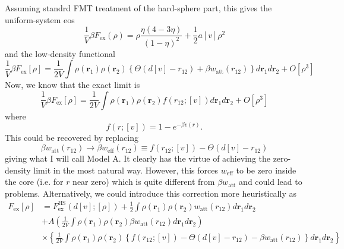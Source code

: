 \documentclass[aps,preprint]{revtex4-1}%
\begin{document}
Assuming standrd FMT treatment of the hard-sphere part, this gives the
uniform-system eos%
\begin{equation}
\frac{1}{V}\beta F_{\text{ex}}\left(  \rho\right)  =\rho\frac{\eta\left(
4-3\eta\right)  }{\left(  1-\eta\right)  ^{2}}+\frac{1}{2}a\left[  v\right]
\rho^{2}%
\end{equation}
and the low-density functional%
\begin{equation}
\frac{1}{V}\beta F_{\text{ex}}\left[  \rho\right]  =\frac{1}{2V}\int%
\rho\left(  \mathbf{r}_{1}\right)  \rho\left(  \mathbf{r}_{2}\right)  \left\{
\Theta\left(  d\left[  v\right]  -r_{12}\right)  +\beta w_{\text{att}}\left(
r_{12}\right)  \right\}  d\mathbf{r}_{1}d\mathbf{r}_{2}+O\left[  \rho
^{3}\right]
\end{equation}
Now, we know that the exact limit is
\begin{equation}
\frac{1}{V}\beta F_{\text{ex}}\left[  \rho\right]  =\frac{1}{2V}\int%
\rho\left(  \mathbf{r}_{1}\right)  \rho\left(  \mathbf{r}_{2}\right)  f\left(
r_{12};\left[  v\right]  \right)  d\mathbf{r}_{1}d\mathbf{r}_{2}+O\left[
\rho^{3}\right]
\end{equation}
where%
\begin{equation}
f\left(  r;\left[  v\right]  \right)  =1-e^{-\beta v\left(  r\right)  }.
\end{equation}
This could be recovered by replacing
\begin{equation}
\beta w_{\text{att}}\left(  r_{12}\right)  \rightarrow\beta w_{\text{eff}%
}\left(  r_{12}\right)  \equiv f\left(  r_{12};\left[  v\right]  \right)
-\Theta\left(  d\left[  v\right]  -r_{12}\right)
\end{equation}
giving what I will call Model A. It clearly has the virtue of achieving the
zero-density limit in the most natural way. However, this forces
$w_{\text{eff}}$ to be zero inside the core (i.e. for $r$ near zero) which is
quite different from $\beta w_{\text{att}}$ and could lead to problems.
Alternatively, we could introduce this correction more heuristically as%
\begin{align}
F_{\text{ex}}\left[  \rho\right]   &  =F_{\text{ex}}^{\text{HS}}\left(
d\left[  v\right]  ;\left[  \rho\right]  \right)  +\frac{1}{2}\int\rho\left(
\mathbf{r}_{1}\right)  \rho\left(  \mathbf{r}_{2}\right)  w_{\text{att}%
}\left(  r_{12}\right)  d\mathbf{r}_{1}d\mathbf{r}_{2}\\
&  +A\left(  \frac{1}{2V}\int\rho\left(  \mathbf{r}_{1}\right)  \rho\left(
\mathbf{r}_{2}\right)  \beta w_{\text{att}}\left(  r_{12}\right)
d\mathbf{r}_{1}d\mathbf{r}_{2}\right) \nonumber\\
&  \times\left\{  \frac{1}{2V}\int\rho\left(  \mathbf{r}_{1}\right)
\rho\left(  \mathbf{r}_{2}\right)  \left\{  f\left(  r_{12};\left[  v\right]
\right)  -\Theta\left(  d\left[  v\right]  -r_{12}\right)  -\beta
w_{\text{att}}\left(  r_{12}\right)  \right\}  d\mathbf{r}_{1}d\mathbf{r}%
_{2}\right\} \nonumber
\end{align}
\end{document}

